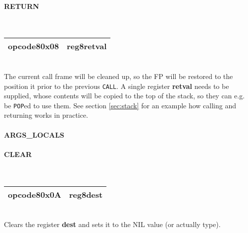 \documentclass[12pt,a4paper]{article}
\begin{document}
\vspace{2em}\begin{minipage}{\textwidth}
\paragraph{RETURN}
~\vspace{1em}\\\begin{tabular}{|p{2cm}|p{2cm}|}
\hline
opcode8\newline\textbf{0x08} & reg8\newline\textbf{retval} \\
\hline
\end{tabular}\vspace{1em}\\
The current call frame will be cleaned up, so the FP will be restored to the
position it prior to the previous \verb|CALL|. A single register \textbf{retval}
needs to be supplied, whose contents will be copied to the top of the stack, so
they can e.g. be \verb|POP|ed to use them. See section \ref{sec:stack} for an
example how calling and returning works in practice.
\end{minipage}

\vspace{2em}\begin{minipage}{\textwidth}
\paragraph{ARGS\_LOCALS}
\end{minipage}

\vspace{2em}\begin{minipage}{\textwidth}
\paragraph{CLEAR}
~\vspace{1em}\\\begin{tabular}{|p{2cm}|p{2cm}|}
\hline
opcode8\newline\textbf{0x0A} & reg8\newline\textbf{dest} \\
\hline
\end{tabular}\vspace{1em}\\
Clears the register \textbf{dest} and sets it to the NIL value (or actually
type).
\end{minipage}
\end{document}
